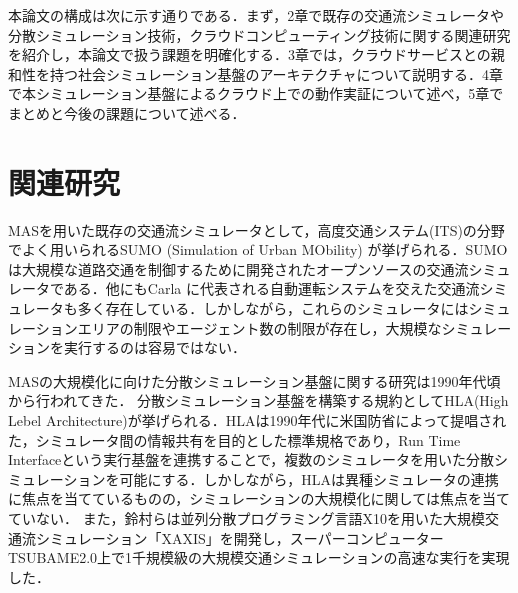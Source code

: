 \documentclass[originalpaper]{jsaiart}     %
\begin{document}
本論文の構成は次に示す通りである．まず，2章で既存の交通流シミュレータや分散シミュレーション技術，クラウドコンピューティング技術に関する関連研究を紹介し，本論文で扱う課題を明確化する．3章では，クラウドサービスとの親和性を持つ社会シミュレーション基盤のアーキテクチャについて説明する．4章で本シミュレーション基盤によるクラウド上での動作実証について述べ，5章でまとめと今後の課題について述べる．

\section{関連研究}%




% 

MASを用いた既存の交通流シミュレータとして，高度交通システム(ITS)の分野でよく用いられるSUMO (Simulation of Urban MObility) \cite{Behrisch}が挙げられる．SUMOは大規模な道路交通を制御するために開発されたオープンソースの交通流シミュレータである．他にもCarla \cite{Dosovitskiy}に代表される自動運転システムを交えた交通流シミュレータも多く存在している\cite{Aoki,Bhat}．しかしながら，これらのシミュレータにはシミュレーションエリアの制限やエージェント数の制限が存在し，大規模なシミュレーションを実行するのは容易ではない．

MASの大規模化に向けた分散シミュレーション基盤に関する研究は1990年代頃から行われてきた．
分散シミュレーション基盤を構築する規約としてHLA(High Lebel Architecture)\cite{Muhammad}が挙げられる．HLAは1990年代に米国防省によって提唱された，シミュレータ間の情報共有を目的とした標準規格であり，Run Time Interfaceという実行基盤を連携することで，複数のシミュレータを用いた分散シミュレーションを可能にする．しかしながら，HLAは異種シミュレータの連携に焦点を当てているものの，シミュレーションの大規模化に関しては焦点を当てていない．
また，鈴村らは並列分散プログラミング言語X10を用いた大規模交通流シミュレーション「XAXIS」を開発し，スーパーコンピューターTSUBAME2.0上で1千規模級の大規模交通シミュレーションの高速な実行を実現した\cite{Suzumura}．
\end{document}
